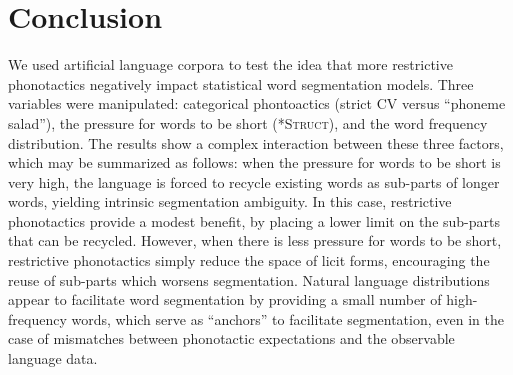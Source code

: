 \documentclass[11pt]{article}
\begin{document}
\section{Conclusion}
\vspace*{-5pt}
We used artificial language corpora to test the idea that more restrictive phonotactics negatively impact statistical word segmentation models. Three variables were manipulated: categorical phontoactics (strict CV versus ``phoneme salad''), the pressure for words to be short (\textsc{*Struct}), and the word frequency distribution. The results show a complex interaction between these three factors, which may be summarized as follows: when the pressure for words to be short is very high, the language is forced to recycle existing words as sub-parts of longer words, yielding intrinsic segmentation ambiguity. In this case, restrictive phonotactics provide a modest benefit, by placing a lower limit on the sub-parts that can be recycled. However, when there is less pressure for words to be short, restrictive phonotactics simply reduce the space of licit forms, encouraging the reuse of sub-parts which worsens segmentation. Natural language distributions appear to facilitate word segmentation by providing a small number of high-frequency words, which serve as ``anchors'' to facilitate segmentation, even in the case of mismatches between phonotactic expectations and the observable language data. %



\end{document}
